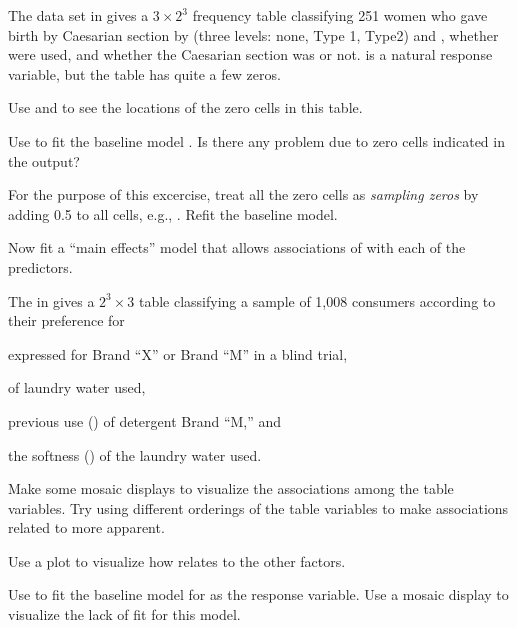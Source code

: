 \documentclass[11pt]{report}\usepackage[]{graphicx}\usepackage[]{color}
\begin{document}
\begin{Exercises}
  \exercise\label{lab:caesar-loglin} The data set  in  gives a $3 \times 2^3$ 
  frequency table
  classifying 251 women who gave birth by Caesarian section by  (three levels: none, Type 1, Type2)
  and , whether  were used,  and whether the Caesarian section was 
  or not.  is a natural response variable, but the table has quite a few zeros.
  \begin{enumerate*}
    \item Use  and  to see the locations of the zero cells in this table.
    \item Use  to fit the baseline model . Is there any problem due to 
    zero cells indicated in the output?
    \item For the purpose of this excercise, treat all the zero cells as \emph{sampling zeros}
    by adding 0.5 to all cells, e.g., .
    Refit the baseline model.
    \item Now fit a ``main effects'' model 
    that allows associations of  with each of
    the predictors. 
  \end{enumerate*}

  \exercise The  in  gives a $2^3 \times 3$ table classifying 
  a sample of 1,008 consumers according to their preference for  
  \begin{seriate}
    \item expressed  for Brand ``X'' or Brand ``M'' in a blind trial,
    \item {} of laundry water used,
    \item previous use () of detergent Brand ``M,'' and
    \item the softness () of the laundry water used.
  \end{seriate}
  \begin{enumerate*}
    \item Make some mosaic displays to visualize the associations among the table variables.  
    Try using different orderings of the table variables to make associations related to  more apparent.
    \item Use a  plot to visualize how  relates to the other factors.
    \item Use  to fit the baseline model  for  as the response variable.
    Use a mosaic display to visualize the lack of fit for this model.
  \end{enumerate*}


\end{Exercises}
\end{document}
